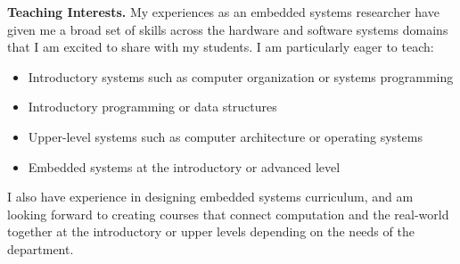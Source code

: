 \documentclass[12pt]{article} %
\begin{document}
\textbf{Teaching Interests.}
My experiences as an embedded systems researcher have given me a broad set of
skills across the hardware and software systems domains that I am excited to
share with my students. I am particularly eager to teach:
%
\begin{itemize}
  \item Introductory systems such as computer organization or systems programming
  \item Introductory programming or data structures
  \item Upper-level systems such as computer architecture or operating systems
  \item Embedded systems at the introductory or advanced level
\end{itemize}
%
I also have experience in designing embedded systems curriculum, and am looking
forward to creating courses that connect computation and the real-world
together at the introductory or upper levels depending on the needs of
the department.


%
\end{document}
